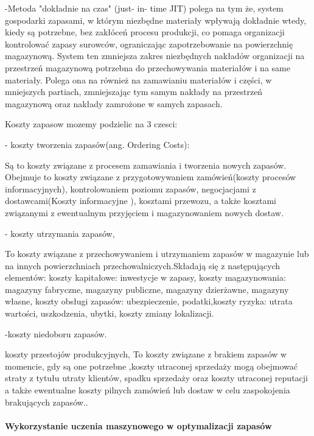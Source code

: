 -Metoda "dokładnie na czas" (just- in- time JIT) polega na tym że, system gospodarki zapasami, w którym niezbędne materiały wpływają dokładnie wtedy, kiedy są potrzebne, bez zakłóceń procesu produkcji, co pomaga organizacji kontrolować zapasy surowców, ograniczając zapotrzebowanie na powierzchnię magazynową. System ten zmniejsza zakres niezbędnych nakładów organizacji na przestrzeń magazynową potrzebna do przechowywania materiałów i na same materiały. Polega ona na również na zamawianiu materiałów i części, w mniejszych partiach, zmniejszając tym samym nakłady na przestrzeń magazynową oraz nakłady zamrożone w samych zapasach. 


Koszty zapasow mozemy podzielic na 3 czesci:


   - koszty tworzenia zapasów(ang. Ordering Costs):

    Są to koszty związane z procesem zamawiania i tworzenia nowych zapasów. Obejmuje to koszty związane z przygotowywaniem zamówień(koszty procesów informacyjnych), kontrolowaniem poziomu zapasów, negocjacjami z dostawcami(Koszty informacyjne ), kosztami przewozu, a także kosztami związanymi z ewentualnym przyjęciem i magazynowaniem nowych dostaw.
  
   
   - koszty utrzymania zapasów,

   To koszty związane z przechowywaniem i utrzymaniem zapasów w magazynie lub na innych powierzchniach przechowalniczych.Składają się z następujących elementów: koszty kapitałowe: inwestycje w zapasy, koszty magazynowania: magazyny fabryczne, magazyny publiczne, magazyny dzierżawne, magazyny własne, koszty obsługi zapasów: ubezpieczenie, podatki,koszty ryzyka: utrata wartości, uszkodzenia, ubytki, koszty zmiany lokalizacji.
    
  -koszty niedoboru zapasów.

  koszty przestojów produkcyjnych, To koszty związane z brakiem zapasów w momencie, gdy są one potrzebne ,koszty utraconej sprzedaży mogą obejmować straty z tytułu utraty klientów, spadku sprzedaży oraz koszty utraconej reputacji a także ewentualne koszty pilnych zamówień lub dostaw w celu zaspokojenia brakujących zapasów.. 
 
 
\cite{enc2023}\cite{Prav2020}\cite{Hanne2017}


\paragraph{Wykorzystanie uczenia maszynowego w optymalizacji zapasów}

